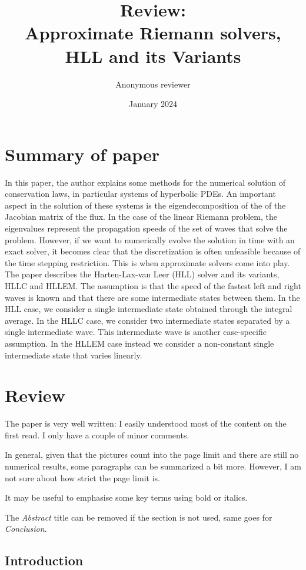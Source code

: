 \documentclass{scrartcl}
\title{Review: \\Approximate Riemann solvers, HLL and its Variants}
\author{Anonymous reviewer} %
\date{January 2024}
\begin{document}
\maketitle

\section{Summary of paper}

In this paper, the author explains some methods for the numerical solution of conservation laws, in particular systems of hyperbolic PDEs. An important aspect in the solution of these systems is the eigendecomposition of the of the Jacobian matrix of the flux. In the case of the linear Riemann problem, the eigenvalues represent the propagation speeds of the set of waves that solve the problem. However, if we want to numerically evolve the solution in time with an exact solver, it becomes clear that the discretization is often unfeasible because of the time stepping restriction. This is when approximate solvers come into play. The paper describes the Harten-Lax-van Leer (HLL) solver and its variants, HLLC and HLLEM. The assumption is that the speed of the fastest left and right waves is known and that there are some intermediate states between them. In the HLL case, we consider a single intermediate state obtained through the integral average. In the HLLC case, we consider two intermediate states separated by a single intermediate wave. This intermediate wave is another case-specific assumption. In the HLLEM case instead we consider a non-constant single intermediate state that varies linearly. 

\section{Review}

The paper is very well written: I easily understood most of the content on the first read. I only have a couple of minor comments.

In general, given that the pictures count into the page limit and there are still no numerical results, some paragraphs can be summarized a bit more. However, I am not sure about how strict the page limit is.

It may be useful to emphasise some key terms using bold or italics.

The \textit{Abstract} title can be removed if the section is not used, same goes for \textit{Conclusion}.

\subsection{Introduction}
\end{document}
